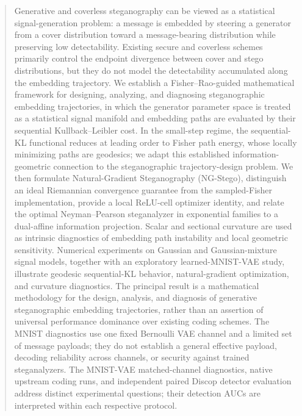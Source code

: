 \documentclass[a4paper,fleqn]{cas-dc}
\begin{document}
\author{Anonymous}
\begin{abstract}
Generative and coverless steganography can be viewed as a statistical
signal-generation problem: a message is embedded by steering a generator from a
cover distribution toward a message-bearing distribution while preserving low
detectability. Existing secure and coverless schemes primarily control the
endpoint divergence between cover and stego distributions, but they do not model
the detectability accumulated along the embedding trajectory. We establish a
Fisher--Rao-guided mathematical framework for designing, analyzing, and
diagnosing steganographic embedding trajectories, in which the generator parameter space is
treated as a statistical signal manifold and embedding paths are evaluated by
their sequential Kullback--Leibler cost. In the small-step regime, the sequential-KL functional reduces at leading
order to Fisher path energy, whose locally minimizing paths are geodesics;
we adapt this established information-geometric connection to the
steganographic trajectory-design problem. We then formulate
Natural-Gradient Steganography (NG-Stego), distinguish an ideal
Riemannian convergence guarantee from the sampled-Fisher implementation,
provide a local ReLU-cell optimizer identity, and relate the optimal
Neyman--Pearson steganalyzer in exponential families to a dual-affine
information projection. Scalar and sectional curvature are used as intrinsic diagnostics of embedding
path instability and local geometric sensitivity. Numerical
experiments on Gaussian and Gaussian-mixture signal models, together
with an exploratory learned-MNIST-VAE study, illustrate geodesic sequential-KL
behavior, natural-gradient optimization, and curvature diagnostics. The principal result is a mathematical methodology for the design, analysis,
and diagnosis of generative steganographic embedding trajectories, rather than
an assertion of universal performance dominance over existing coding schemes. The MNIST diagnostics use one fixed Bernoulli
VAE channel and a limited set of message payloads; they do not establish a
general effective payload, decoding reliability across channels, or security
against trained steganalyzers.
The MNIST-VAE matched-channel diagnostics, native upstream coding runs, and
independent paired Discop detector evaluation address distinct experimental
questions; their detection AUCs are interpreted within each respective protocol.

\end{abstract}
\end{document}
